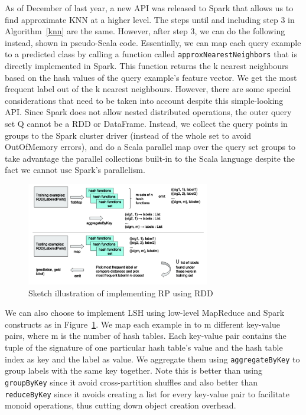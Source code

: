 \documentclass[letterpaper,twocolumn,10pt]{article}
\theoremstyle{definition}
\begin{document}
As of December of last year, a new API was released to Spark that allows us to find approximate KNN 
at a higher level. The steps until and including step 3 in Algorithm~\ref{knn} are the same. However, 
after step 3, we can do the following instead, shown in pseudo-Scala code. Essentially, we can map 
each query example to a predicted class by calling a function called \texttt{approxNearestNeighbors} 
that is directly implemented in Spark. This function returns the k nearest neighbours based on the 
hash values of the query example's feature vector. We get the most frequent label out of the k nearest 
neighbours. However, there are some special considerations that need to be 
taken into account despite this simple-looking API. Since Spark does not allow nested distributed 
operations, the outer query set Q cannot be a RDD or DataFrame. Instead, we collect the query points 
in groups to the Spark cluster driver (instead of the whole set to avoid OutOfMemory errors), and do a 
Scala parallel map over the query set groups to take advantage the parallel collections built-in to the 
Scala language despite the fact we cannot use Spark's parallelism. 


\begin{figure}[H]
	\center
	\includegraphics[width=8cm]{rdd}
	\caption{Sketch illustration of implementing RP using RDD}
	\label{figure:rdd}
\end{figure}

We can also choose to implement LSH using low-level MapReduce and Spark constructs as in 
Figure~\ref{figure:rdd}. We map each example in to m different key-value pairs, where m is the number 
of hash tables. Each key-value pair contains the tuple of the signature of one particular hash table's 
value and the hash table index as key and the label as value. We aggregate them using 
\texttt{aggregateByKey} to group labels with the same key together. Note this is better than using 
\texttt{groupByKey} since it avoid cross-partition shuffles and also better than \texttt{reduceByKey} 
since it avoids creating a list for every key-value pair to facilitate monoid operations, thus cutting down 
object creation overhead. \\
\end{document}
